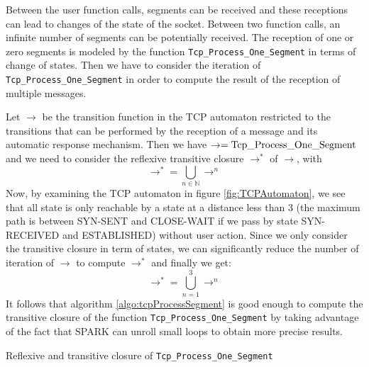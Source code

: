 \documentclass[a4paper, 10pt]{article}
\begin{document}
    Between the user function calls, segments can be received and these receptions can lead to
    changes of the state of the socket. Between two function calls, an infinite number of segments
    can be potentially received. The reception of one or zero segments is modeled by the function
    \lstinline[language=Ada]{Tcp_Process_One_Segment} in terms of change of states. Then we have
    to consider the iteration of \lstinline[language=Ada]{Tcp_Process_One_Segment} in order to
    compute the result of the reception of multiple messages.

    Let $\rightarrow$ be the transition function in the TCP automaton restricted to the transitions
    that can be performed by the reception of a message and its automatic response mechanism.
    Then we have $\rightarrow = \text{\lstinline[language=Ada]{Tcp_Process_One_Segment}}$ and
    we need to consider the reflexive transitive closure $\rightarrow^*$ of $\rightarrow$, with
    \[\rightarrow^* = \bigcup_{n\in\mathbb{N}} \rightarrow^n\]
    Now, by examining the TCP automaton in figure \ref{fig:TCPAutomaton}, we see that all state is
    only reachable by a state at a distance less than 3 (the maximum path is between SYN-SENT and
    CLOSE-WAIT if we pass by state SYN-RECEIVED and ESTABLISHED) without user action. Since
    we only consider the transitive closure in term of states, we can significantly reduce the number
    of iteration of $\rightarrow$ to compute $\rightarrow^*$ and finally we get:
    \[\rightarrow^* = \bigcup_{n=1}^3 \rightarrow^n\]
    It follows that algorithm \ref{algo:tcpProcessSegment} is good enough to compute the transitive closure of the function
    \lstinline[language=Ada]{Tcp_Process_One_Segment} by taking advantage of the fact that SPARK can unroll
    small loops to obtain more precise results.

    \begin{algorithm}[t]
        \caption{Reflexive and transitive closure of \lstinline[language=Ada]{Tcp_Process_One_Segment}}
        \label{algo:tcpProcessSegment}
    \end{algorithm}
\end{document}
